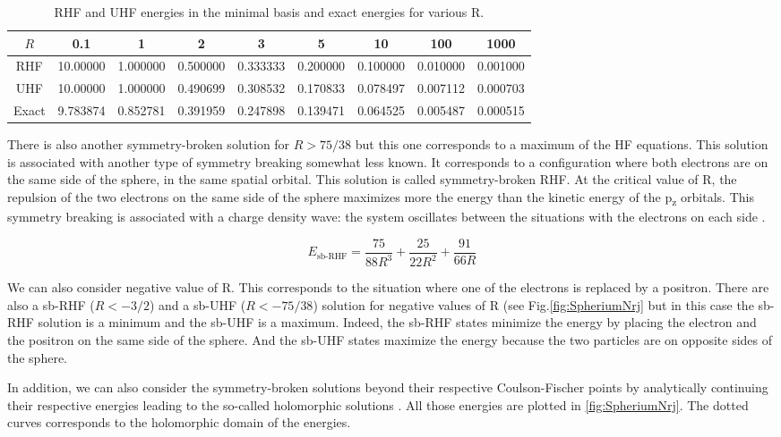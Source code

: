 \documentclass[11pt,a4paper]{article}
\begin{document}
\begin{table}[h!]
\centering
\caption{\centering RHF and UHF energies in the minimal basis and exact energies for various R.}
\begin{tabular}{ccccccccc}
\hline
\hline
$R$ & 0.1 & 1 & 2 & 3 & 5 & 10 & 100 & 1000 \\
\hline
RHF 	& 10.00000 & 1.000000 & 0.500000 & 0.333333 & 0.200000 & 0.100000 & 0.010000 & 0.001000 \\
UHF 	& 10.00000 & 1.000000 & 0.490699 & 0.308532 & 0.170833 & 0.078497 & 0.007112 & 0.000703 \\
Exact 	& 9.783874 & 0.852781 & 0.391959 & 0.247898 & 0.139471 & 0.064525 & 0.005487 & 0.000515 \\
\hline
\hline
\end{tabular}
\label{tab:ERHFvsEUHF}
\end{table}

There is also another symmetry-broken solution for $R>75/38$ but this one corresponds to a maximum of the HF equations. This solution is associated with another type of symmetry breaking somewhat less known. It corresponds to a configuration where both electrons are on the same side of the sphere, in the same spatial orbital. This solution is called symmetry-broken RHF. At the critical value of R, the repulsion of the two electrons on the same side of the sphere maximizes more the energy than the kinetic energy of the p\textsubscript{z} orbitals. This symmetry breaking is associated with a charge density wave: the system oscillates between the situations with the electrons on each side \cite{GiulianiBook}.

\begin{equation}
E_{\text{sb-RHF}}=\frac{75}{88R^3}+\frac{25}{22R^2}+\frac{91}{66R}
\end{equation}

We can also consider negative value of R. This corresponds to the situation where one of the electrons is replaced by a positron. There are also a sb-RHF ($R<-3/2$) and a sb-UHF ($R<-75/38$) solution for negative values of R (see Fig.\ref{fig:SpheriumNrj} but in this case the sb-RHF solution is a minimum and the sb-UHF is a maximum. Indeed, the sb-RHF states minimize the energy by placing the electron and the positron on the same side of the sphere. And the sb-UHF states maximize the energy because the two particles are on opposite sides of the sphere.

In addition, we can also consider the symmetry-broken solutions beyond their respective Coulson-Fischer points by analytically continuing their respective energies leading to the so-called holomorphic solutions \cite{Hiscock_2014, Burton_2019, Burton_2019a}. All those energies are plotted in \autoref{fig:SpheriumNrj}. The dotted curves corresponds to the holomorphic domain of the energies.
\end{document}
